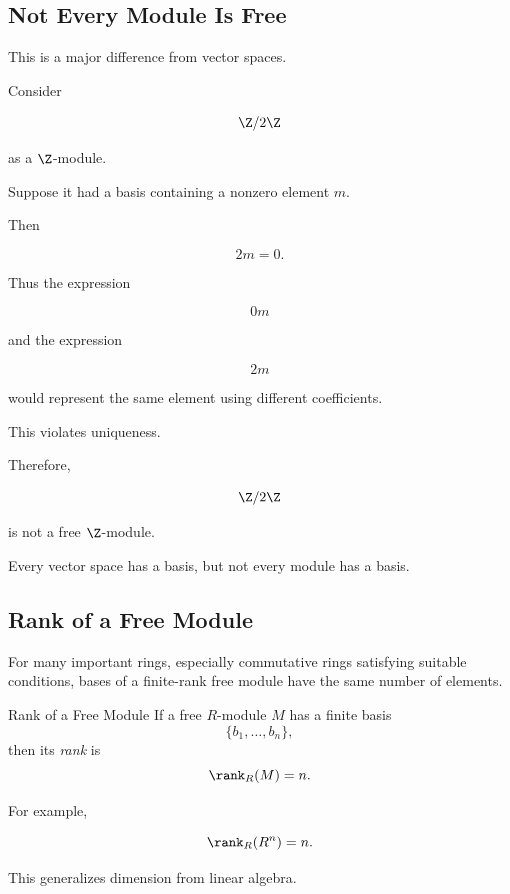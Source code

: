 \subsection{Not Every Module Is Free}
\label{subsec:not-every-module-free}

This is a major difference from vector spaces.

Consider

\[ \Z/2\Z \]

as a \(\Z\)-module.

Suppose it had a basis containing a nonzero element \(m\).

Then

\[ 2m=0. \]

Thus the expression

\[ 0m \]

and the expression

\[ 2m \]

would represent the same element using different coefficients.

This violates uniqueness.

Therefore,

\[ \Z/2\Z \]

is not a free \(\Z\)-module.

\begin{warningbox}
Every vector space has a basis, but not every module has a basis.
\end{warningbox}

\subsection{Rank of a Free Module}
\label{subsec:rank-free-module}

For many important rings, especially commutative rings satisfying suitable
conditions, bases of a finite-rank free module have the same number of
elements.

\begin{definitionbox}{Rank of a Free Module}
If a free \(R\)-module \(M\) has a finite basis
\[ \{b_1,\ldots,b_n\}, \]
then its \emph{rank} is
\[ \rank_R(M)=n. \]
\end{definitionbox}

For example,

\[ \rank_R(R^n)=n. \]

This generalizes dimension from linear algebra.

